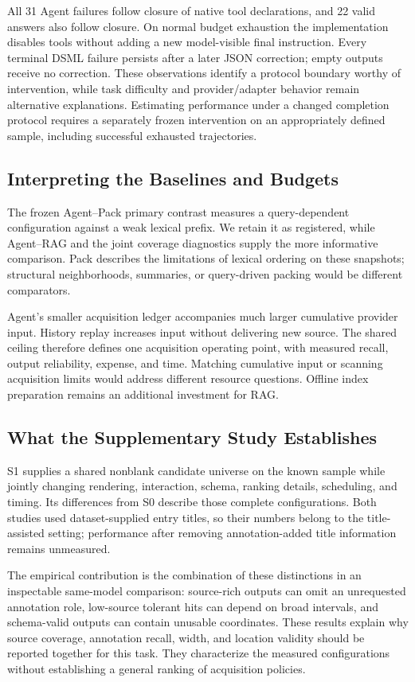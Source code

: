 All 31 Agent failures follow closure of native tool declarations, and 22 valid answers also follow closure. On normal budget exhaustion the implementation disables tools without adding a new model-visible final instruction. Every terminal DSML failure persists after a later JSON correction; empty outputs receive no correction. These observations identify a protocol boundary worthy of intervention, while task difficulty and provider/adapter behavior remain alternative explanations. Estimating performance under a changed completion protocol requires a separately frozen intervention on an appropriately defined sample, including successful exhausted trajectories.

\subsection{Interpreting the Baselines and Budgets}
The frozen Agent--Pack primary contrast measures a query-dependent configuration against a weak lexical prefix. We retain it as registered, while Agent--RAG and the joint coverage diagnostics supply the more informative comparison. Pack describes the limitations of lexical ordering on these snapshots; structural neighborhoods, summaries, or query-driven packing would be different comparators.

Agent's smaller acquisition ledger accompanies much larger cumulative provider input. History replay increases input without delivering new source. The shared ceiling therefore defines one acquisition operating point, with measured recall, output reliability, expense, and time. Matching cumulative input or scanning acquisition limits would address different resource questions. Offline index preparation remains an additional investment for RAG.

\subsection{What the Supplementary Study Establishes}
S1 supplies a shared nonblank candidate universe on the known sample while jointly changing rendering, interaction, schema, ranking details, scheduling, and timing. Its differences from S0 describe those complete configurations. Both studies used dataset-supplied entry titles, so their numbers belong to the title-assisted setting; performance after removing annotation-added title information remains unmeasured.

The empirical contribution is the combination of these distinctions in an inspectable same-model comparison: source-rich outputs can omit an unrequested annotation role, low-source tolerant hits can depend on broad intervals, and schema-valid outputs can contain unusable coordinates. These results explain why source coverage, annotation recall, width, and location validity should be reported together for this task. They characterize the measured configurations without establishing a general ranking of acquisition policies.
